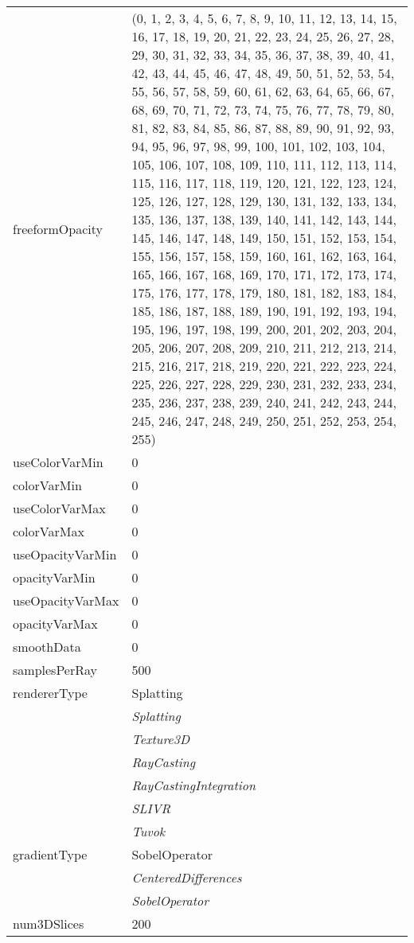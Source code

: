 \documentclass[10pt,a4paper]{report}
\begin{document}
\begin{longtable}{lp{7.5cm}}
freeformOpacity  &  (0, 1, 2, 3, 4, 5, 6, 7, 8, 9, 10, 11, 12, 13, 14, 15, 16, 17, 18, 19, 20, 21, 22, 23, 24, 25, 26, 27, 28, 29, 30, 31, 32, 33, 34, 35, 36, 37, 38, 39, 40, 41, 42, 43, 44, 45, 46, 47, 48, 49, 50, 51, 52, 53, 54, 55, 56, 57, 58, 59, 60, 61, 62, 63, 64, 65, 66, 67, 68, 69, 70, 71, 72, 73, 74, 75, 76, 77, 78, 79, 80, 81, 82, 83, 84, 85, 86, 87, 88, 89, 90, 91, 92, 93, 94, 95, 96, 97, 98, 99, 100, 101, 102, 103, 104, 105, 106, 107, 108, 109, 110, 111, 112, 113, 114, 115, 116, 117, 118, 119, 120, 121, 122, 123, 124, 125, 126, 127, 128, 129, 130, 131, 132, 133, 134, 135, 136, 137, 138, 139, 140, 141, 142, 143, 144, 145, 146, 147, 148, 149, 150, 151, 152, 153, 154, 155, 156, 157, 158, 159, 160, 161, 162, 163, 164, 165, 166, 167, 168, 169, 170, 171, 172, 173, 174, 175, 176, 177, 178, 179, 180, 181, 182, 183, 184, 185, 186, 187, 188, 189, 190, 191, 192, 193, 194, 195, 196, 197, 198, 199, 200, 201, 202, 203, 204, 205, 206, 207, 208, 209, 210, 211, 212, 213, 214, 215, 216, 217, 218, 219, 220, 221, 222, 223, 224, 225, 226, 227, 228, 229, 230, 231, 232, 233, 234, 235, 236, 237, 238, 239, 240, 241, 242, 243, 244, 245, 246, 247, 248, 249, 250, 251, 252, 253, 254, 255) \\
useColorVarMin  &  0 \\
colorVarMin  &  0 \\
useColorVarMax  &  0 \\
colorVarMax  &  0 \\
useOpacityVarMin  &  0 \\
opacityVarMin  &  0 \\
useOpacityVarMax  &  0 \\
opacityVarMax  &  0 \\
smoothData  &  0 \\
samplesPerRay  &  500 \\
rendererType  &  Splatting   \\
 & {\it  Splatting} \\
 & {\it  Texture3D} \\
 & {\it  RayCasting} \\
 & {\it  RayCastingIntegration} \\
 & {\it  SLIVR} \\
 & {\it  Tuvok} \\
gradientType  &  SobelOperator   \\
 & {\it  CenteredDifferences} \\
 & {\it  SobelOperator} \\
num3DSlices  &  200 \\

\end{longtable}
\end{document}
